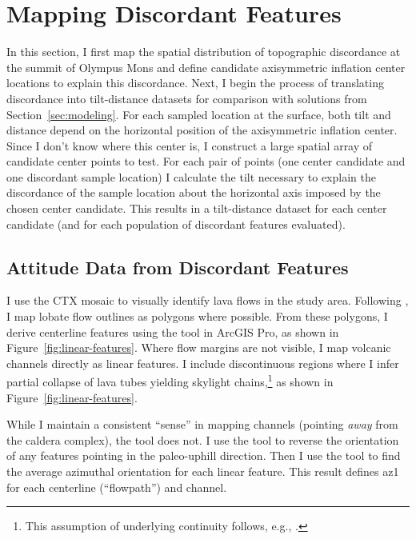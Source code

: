 \section{Mapping Discordant Features}\label{sec:mapping}

In this section, I first map the spatial distribution of topographic discordance at the summit of Olympus Mons and define candidate axisymmetric inflation center locations to explain this discordance. Next, I begin the process of translating discordance into tilt-distance datasets for comparison with solutions from Section~\ref{sec:modeling}. For each sampled location at the surface, both tilt and distance depend on the horizontal position of the axisymmetric inflation center. Since I don't know where this center is, I construct a large spatial array of candidate center points to test. For each pair of points (one center candidate and one discordant sample location) I calculate the tilt necessary to explain the discordance of the sample location about the horizontal axis imposed by the chosen center candidate. This results in a tilt-distance dataset for each center candidate (and for each population of discordant features evaluated).

\subsection{Attitude Data from Discordant Features}\label{sec:attitude-data}

I use the \ac{CTX} mosaic to visually identify lava flows in the study area. Following \textcite{mouginis-mark_geologic_2021}, I map lobate flow outlines as polygons where possible. From these polygons, I derive centerline features using the  tool in ArcGIS Pro, as shown in Figure~\ref{fig:linear-features}. Where flow margins are not visible, I map volcanic channels directly as linear features. I include discontinuous regions where I infer partial collapse of lava tubes yielding skylight chains,\footnote{This assumption of underlying continuity follows, e.g., \textcite{bleacher_olympus_2007,carr_geologic_2010,peters_lava_2021}.} as shown in Figure~\ref{fig:linear-features}.

While I maintain a consistent ``sense'' in mapping channels (pointing \emph{away} from the caldera complex), the  tool does not. I use the  tool to reverse the orientation of any features pointing in the paleo-uphill direction. Then I use the  tool to find the average azimuthal orientation for each linear feature. This result defines \acf{az1} for each centerline (``flowpath'') and channel.

